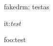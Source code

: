 \documentclass{article}
\begin{document}
{fakedrm: \fakedrm testas}

{it:\textit{test}}
 
{foo:\foo test}
\end{document}

